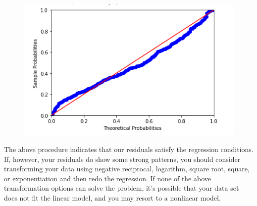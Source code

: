 \documentclass{article}
\begin{document}
\begin{figure}[H]\centering\includegraphics[width=0.6\linewidth]{22}\end{figure}
The above procedure indicates that our residuals satisfy the regression conditions. If, however, your residuals do show some strong patterns, you should consider transforming your data using negative reciprocal, logarithm, square root, square, or exponentiation and then redo the regression. If none of the above transformation options can solve the problem, it's possible that your data set does not fit the linear model, and you may resort to a nonlinear model.
\end{document}
